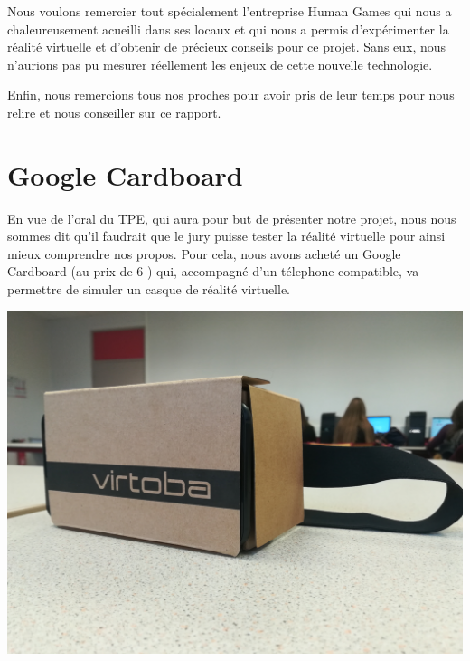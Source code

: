 \documentclass[12pt, a4paper]{report}
\newcommand{\euro}{\,\EUR}
\begin{document}
Nous voulons remercier tout spécialement l'entreprise Human Games qui nous a chaleureusement acueilli dans ses locaux et qui nous a permis d'expérimenter la réalité virtuelle et d'obtenir de précieux conseils pour ce projet. Sans eux, nous n'aurions pas pu mesurer réellement les enjeux de cette nouvelle technologie.

Enfin, nous remercions tous nos proches pour avoir pris de leur temps pour nous relire et nous conseiller sur ce rapport.


\chapter*{Google Cardboard}

En vue de l'oral du TPE, qui aura pour but de présenter notre projet, nous nous sommes dit qu'il faudrait que le jury puisse tester la réalité virtuelle pour ainsi mieux comprendre nos propos. Pour cela, nous avons acheté un Google Cardboard (au prix de 6\,\euro) qui, accompagné d'un télephone compatible, va permettre de simuler un casque de réalité virtuelle.

\begin{center}
\includegraphics[scale=0.04]{carton.jpg}
\end{center}
\end{document}
